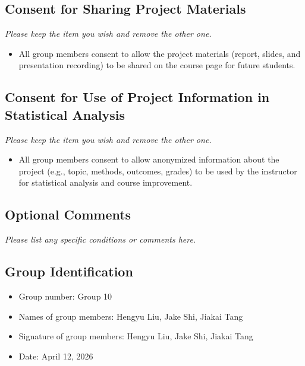 \documentclass{article}
\begin{document}
\subsection*{Consent for Sharing Project Materials}
\textit{Please keep the item you wish and remove the other one.}

\begin{itemize}
	\item All group members consent to allow the project materials (report, slides, and presentation recording) to be shared on the course page for future students.
\end{itemize}

\subsection*{Consent for Use of Project Information in Statistical Analysis}
\textit{Please keep the item you wish and remove the other one.}
\begin{itemize}
	\item All group members consent to allow anonymized information about the project (e.g., topic, methods, outcomes, grades) to be used by the instructor for statistical analysis and course improvement.
\end{itemize}

\subsection*{Optional Comments}
\textit{Please list any specific conditions or comments here.}

\subsection*{Group Identification}

\begin{itemize}
	\item Group number: Group 10
	\item Names of group members: Hengyu Liu, Jake Shi, Jiakai Tang
	\item Signature of group members: Hengyu Liu, Jake Shi, Jiakai Tang
	\item Date: April 12, 2026
\end{itemize}
\end{document}
